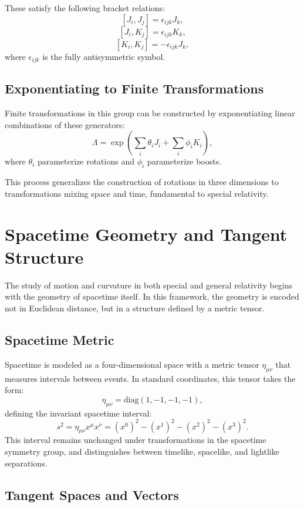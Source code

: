 \documentclass{amsart}
\theoremstyle{remark}
\begin{document}
These satisfy the following bracket relations:
\[
[J_i, J_j] = \epsilon_{ijk} J_k,
\]
\[
[J_i, K_j] = \epsilon_{ijk} K_k,
\]
\[
[K_i, K_j] = -\epsilon_{ijk} J_k,
\]
where \(\epsilon_{ijk}\) is the fully antisymmetric symbol.

\subsection{Exponentiating to Finite Transformations}

Finite transformations in this group can be constructed by exponentiating linear combinations of these generators:
\[
\Lambda = \exp\left(\sum_i \theta_i J_i + \sum_i \phi_i K_i \right),
\]
where \(\theta_i\) parameterize rotations and \(\phi_i\) parameterize boosts.

This process generalizes the construction of rotations in three dimensions to transformations mixing space and time, fundamental to special relativity.

\section{Spacetime Geometry and Tangent Structure}
\label{sec:spacetime_geometry}

The study of motion and curvature in both special and general relativity begins with the geometry of spacetime itself. In this framework, the geometry is encoded not in Euclidean distance, but in a structure defined by a metric tensor.

\subsection{Spacetime Metric}

Spacetime is modeled as a four-dimensional space with a metric tensor \(\eta_{\mu\nu}\) that measures intervals between events. In standard coordinates, this tensor takes the form:
\[
\eta_{\mu\nu} = \mathrm{diag}(1, -1, -1, -1),
\]
defining the invariant spacetime interval:
\[
s^2 = \eta_{\mu\nu} x^\mu x^\nu = (x^0)^2 - (x^1)^2 - (x^2)^2 - (x^3)^2.
\]
This interval remains unchanged under transformations in the spacetime symmetry group, and distinguishes between timelike, spacelike, and lightlike separations.

\subsection{Tangent Spaces and Vectors}
\end{document}
